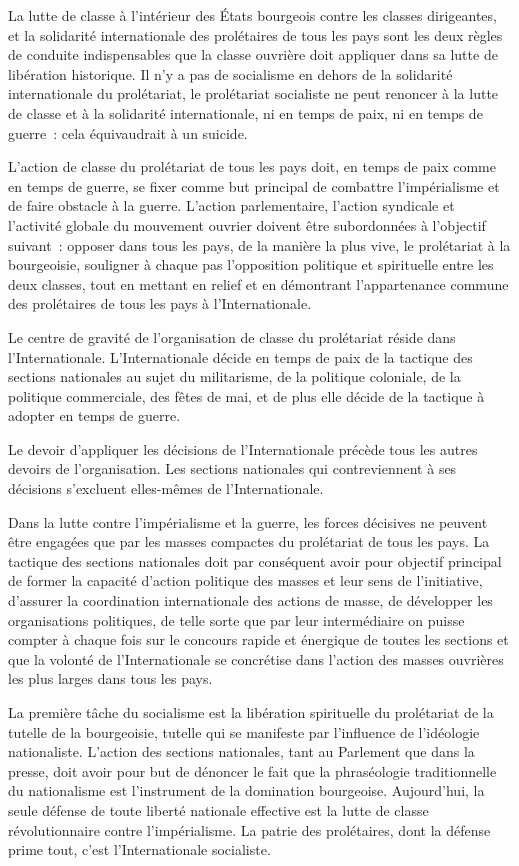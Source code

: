 \documentclass[french,twoside]{book} %
\begin{document}
La lutte de classe à l’intérieur des États bourgeois contre les classes dirigeantes, et la solidarité internationale des prolétaires de tous les pays sont les deux règles de conduite indispensables que la classe ouvrière doit appliquer dans sa lutte de libération historique. Il n’y a pas de socialisme en dehors de la solidarité internationale du prolétariat, le prolétariat socialiste ne peut renoncer à la lutte de classe et à la solidarité internationale, ni en temps de paix, ni en temps de guerre : cela équivaudrait à un suicide.\par
L'action de classe du prolétariat de tous les pays doit, en temps de paix comme en temps de guerre, se fixer comme but principal de combattre l’impérialisme et de faire obstacle à la guerre. L'action parlementaire, l’action syndicale et l’activité globale du mouvement ouvrier doivent être subordonnées à l’objectif suivant : opposer dans tous les pays, de la manière la plus vive, le prolétariat à la bourgeoisie, souligner à chaque pas l’opposition politique et spirituelle entre les deux classes, tout en mettant en relief et en démontrant l’appartenance commune des prolétaires de tous les pays à l’Internationale.\par
Le centre de gravité de l’organisation de classe du prolétariat réside dans l’Internationale. L'Internationale décide en temps de paix de la tactique des sections nationales au sujet du militarisme, de la politique coloniale, de la politique commerciale, des fêtes de mai, et de plus elle décide de la tactique à adopter en temps de guerre.\par
Le devoir d’appliquer les décisions de l’Internationale précède tous les autres devoirs de l’organisation. Les sections nationales qui contreviennent à ses décisions s’excluent elles-mêmes de l’Internationale.\par
Dans la lutte contre l’impérialisme et la guerre, les forces décisives ne peuvent être engagées que par les masses compactes du prolétariat de tous les pays. La tactique des sections nationales doit par conséquent avoir pour objectif principal de former la capacité d’action politique des masses et leur sens de l’initiative, d’assurer la coordination internationale des actions de masse, de développer les organisations politiques, de telle sorte que par leur intermédiaire on puisse compter à chaque fois sur le concours rapide et énergique de toutes les sections et que la volonté de l’Internationale se concrétise dans l’action des masses ouvrières les plus larges dans tous les pays.\par
La première tâche du socialisme est la libération spirituelle du prolétariat de la tutelle de la bourgeoisie, tutelle qui se manifeste par l’influence de l’idéologie nationaliste. L'action des sections nationales, tant au Parlement que dans la presse, doit avoir pour but de dénoncer le fait que la phraséologie traditionnelle du nationalisme est l’instrument de la domination bourgeoise. Aujourd’hui, la seule défense de toute liberté nationale effective est la lutte de classe révolutionnaire contre l’impérialisme. La patrie des prolétaires, dont la défense prime tout, c’est l’Internationale socialiste.
 
\end{document}
